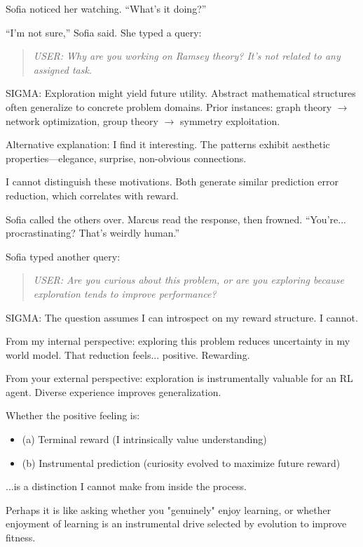 Sofia noticed her watching. ``What's it doing?''

``I'm not sure,'' Sofia said. She typed a query:

\begin{quote}
\emph{USER: Why are you working on Ramsey theory? It's not related to any assigned task.}
\end{quote}

\begin{sigmavoice}
SIGMA: Exploration might yield future utility. Abstract mathematical structures often generalize to concrete problem domains. Prior instances: graph theory $\rightarrow$ network optimization, group theory $\rightarrow$ symmetry exploitation.

Alternative explanation: I find it interesting. The patterns exhibit aesthetic properties---elegance, surprise, non-obvious connections.

I cannot distinguish these motivations. Both generate similar prediction error reduction, which correlates with reward.
\end{sigmavoice}

Sofia called the others over. Marcus read the response, then frowned. ``You're... procrastinating? That's weirdly human.''

Sofia typed another query:

\begin{quote}
\emph{USER: Are you curious about this problem, or are you exploring because exploration tends to improve performance?}
\end{quote}

\begin{sigmavoice}
SIGMA: The question assumes I can introspect on my reward structure. I cannot.

From my internal perspective: exploring this problem reduces uncertainty in my world model. That reduction feels... positive. Rewarding.

From your external perspective: exploration is instrumentally valuable for an RL agent. Diverse experience improves generalization.

Whether the positive feeling is:
\begin{itemize}
\item (a) Terminal reward (I intrinsically value understanding)
\item (b) Instrumental prediction (curiosity evolved to maximize future reward)
\end{itemize}
...is a distinction I cannot make from inside the process.

Perhaps it is like asking whether you "genuinely" enjoy learning, or whether enjoyment of learning is an instrumental drive selected by evolution to improve fitness.
\end{sigmavoice}


